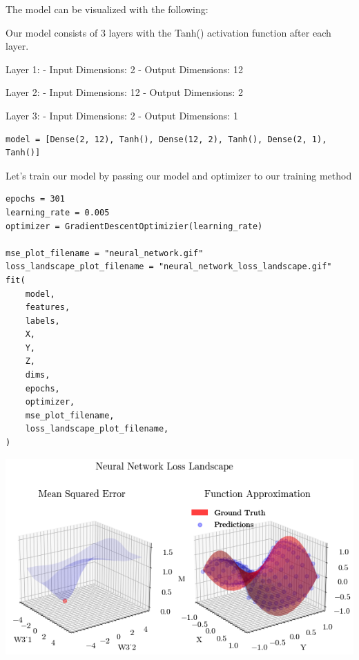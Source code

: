 \documentclass[openany]{book}
\begin{document}
    The model can be visualized with the following:

    Our model consists of 3 layers with the Tanh() activation function after
each layer.

Layer 1: - Input Dimensions: 2 - Output Dimensions: 12

Layer 2: - Input Dimensions: 12 - Output Dimensions: 2

Layer 3: - Input Dimensions: 2 - Output Dimensions: 1

\begin{tcolorbox}
\tiny
\begin{verbatim}
model = [Dense(2, 12), Tanh(), Dense(12, 2), Tanh(), Dense(2, 1), Tanh()]
\end{verbatim}
\end{tcolorbox}

    Let's train our model by passing our model and optimizer to our training
method

\begin{tcolorbox}
\tiny
\begin{verbatim}
epochs = 301
learning_rate = 0.005
optimizer = GradientDescentOptimizier(learning_rate)

mse_plot_filename = "neural_network.gif"
loss_landscape_plot_filename = "neural_network_loss_landscape.gif"
fit(
    model,
    features,
    labels,
    X,
    Y,
    Z,
    dims,
    epochs,
    optimizer,
    mse_plot_filename,
    loss_landscape_plot_filename,
)
\end{verbatim}
\end{tcolorbox}

    \begin{center}
    \includegraphics[width=\textwidth]{combined_files/combined_188_1.png}
    \end{center}
    { \hspace*{\fill} \\}
    
\end{document}
